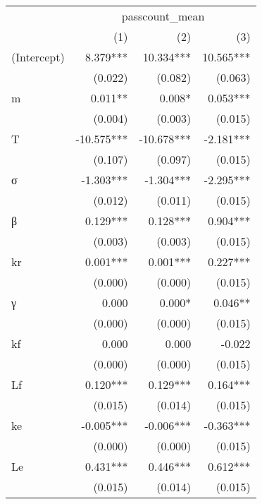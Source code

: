 \begin{tabular}{lrrr}
\toprule
                       &  \multicolumn{3}{c}{passcount\_mean} \\ 
\cmidrule(lr){2-4} 
                       &        (1) &        (2) &        (3) \\ 
\midrule
(Intercept)            &   8.379*** &  10.334*** &  10.565*** \\ 
                       &    (0.022) &    (0.082) &    (0.063) \\ 
m                      &    0.011** &     0.008* &   0.053*** \\ 
                       &    (0.004) &    (0.003) &    (0.015) \\ 
T                      & -10.575*** & -10.678*** &  -2.181*** \\ 
                       &    (0.107) &    (0.097) &    (0.015) \\ 
σ                      &  -1.303*** &  -1.304*** &  -2.295*** \\ 
                       &    (0.012) &    (0.011) &    (0.015) \\ 
β                      &   0.129*** &   0.128*** &   0.904*** \\ 
                       &    (0.003) &    (0.003) &    (0.015) \\ 
kr                     &   0.001*** &   0.001*** &   0.227*** \\ 
                       &    (0.000) &    (0.000) &    (0.015) \\ 
γ                      &      0.000 &     0.000* &    0.046** \\ 
                       &    (0.000) &    (0.000) &    (0.015) \\ 
kf                     &      0.000 &      0.000 &     -0.022 \\ 
                       &    (0.000) &    (0.000) &    (0.015) \\ 
Lf                     &   0.120*** &   0.129*** &   0.164*** \\ 
                       &    (0.015) &    (0.014) &    (0.015) \\ 
ke                     &  -0.005*** &  -0.006*** &  -0.363*** \\ 
                       &    (0.000) &    (0.000) &    (0.015) \\ 
Le                     &   0.431*** &   0.446*** &   0.612*** \\ 
                       &    (0.015) &    (0.014) &    (0.015) \\ 

\end{tabular}
